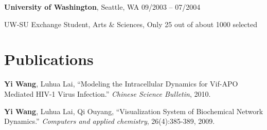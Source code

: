 \documentclass[margin,line]{resume}
\begin{document}
\begin{resume}
    \textbf{University of Washington}, Seattle, WA \hfill 09/2003 -- 07/2004 \vspace{-3mm}\\\vspace{-1mm}%
      \begin{list2}
       \item  UW-SU Exchange Student, Arts \& Sciences, Only 25 out of about 1000 selected
      \end{list2}


    \section{\mysidestyle Publications}

      \textbf{Yi Wang}, Luhua Lai, ``Modeling the Intracellular Dynamics for Vif-APO Mediated HIV-1 Virus Infection.''
      \textsl{Chinese Science Bulletin}, 2010.

      \textbf{Yi Wang}, Luhua Lai, Qi Ouyang, ``Visualization System of Biochemical Network Dynamics.''
      \textsl{Computers and applied chemistry}, 26(4):385-389, 2009.

\end{resume}
\end{document}
